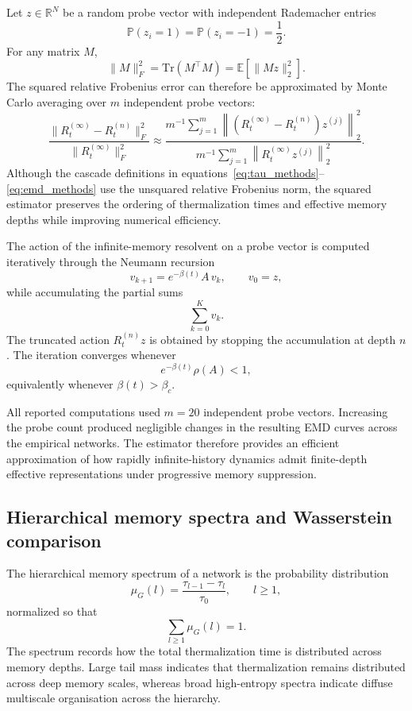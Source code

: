 \documentclass[aps,superscriptaddress,11pt]{revtex4-2}
\theoremstyle{definition}
\theoremstyle{plain}
\begin{document}
Let $z \in \mathbb{R}^N$ be a random probe vector with independent
Rademacher entries
\[
\mathbb{P}(z_i = 1)=\mathbb{P}(z_i=-1)=\frac12.
\]
For any matrix $M$,
\begin{equation}
  \|M\|_F^2
  = \mathrm{Tr}(M^\top M)
  = \mathbb{E}\!\left[\|Mz\|_2^2\right].
  \label{eq:hutchinson_methods}
\end{equation}
The squared relative Frobenius error can therefore be approximated by
Monte Carlo averaging over $m$ independent probe vectors:
\begin{equation}
  \frac{\|R_t^{(\infty)} - R_t^{(n)}\|_F^2}
       {\|R_t^{(\infty)}\|_F^2}
  \approx
  \frac{
    m^{-1}\sum_{j=1}^{m}
    \left\|
      (R_t^{(\infty)} - R_t^{(n)})z^{(j)}
    \right\|_2^2
  }{
    m^{-1}\sum_{j=1}^{m}
    \left\|
      R_t^{(\infty)} z^{(j)}
    \right\|_2^2
  }.
  \label{eq:ratio_estimator_methods}
\end{equation}
Although the cascade definitions in
equations~\eqref{eq:tau_methods}--\eqref{eq:emd_methods}
use the unsquared relative Frobenius norm, the squared estimator preserves
the ordering of thermalization times and effective memory depths while
improving numerical efficiency.

The action of the infinite-memory resolvent on a probe vector is computed
iteratively through the Neumann recursion
\[
v_{k+1}=e^{-\beta(t)}A\,v_k,
\qquad
v_0=z,
\]
while accumulating the partial sums
\[
\sum_{k=0}^{K} v_k.
\]
The truncated action $R_t^{(n)}z$ is obtained by stopping the accumulation
at depth $n$. The iteration converges whenever
\[
e^{-\beta(t)}\rho(A)<1,
\]
equivalently whenever $\beta(t)>\beta_c$.

All reported computations used $m=20$ independent probe vectors.
Increasing the probe count produced negligible changes in the resulting EMD
curves across the empirical networks. The estimator therefore provides an
efficient approximation of how rapidly infinite-history dynamics admit
finite-depth effective representations under progressive memory
suppression.

\subsection{Hierarchical memory spectra and Wasserstein comparison}

The hierarchical memory spectrum of a network is the probability
distribution
\begin{equation}
  \mu_G(l)
  =
  \frac{\tau_{l-1}-\tau_l}{\tau_0},
  \qquad l\ge1,
  \label{eq:hms_methods}
\end{equation}
normalized so that
\[
\sum_{l\ge1}\mu_G(l)=1.
\]
The spectrum records how the total thermalization time is distributed
across memory depths. Large tail mass indicates that thermalization
remains distributed across deep memory scales, whereas broad
high-entropy spectra indicate diffuse multiscale organisation across the
hierarchy.
\end{document}
